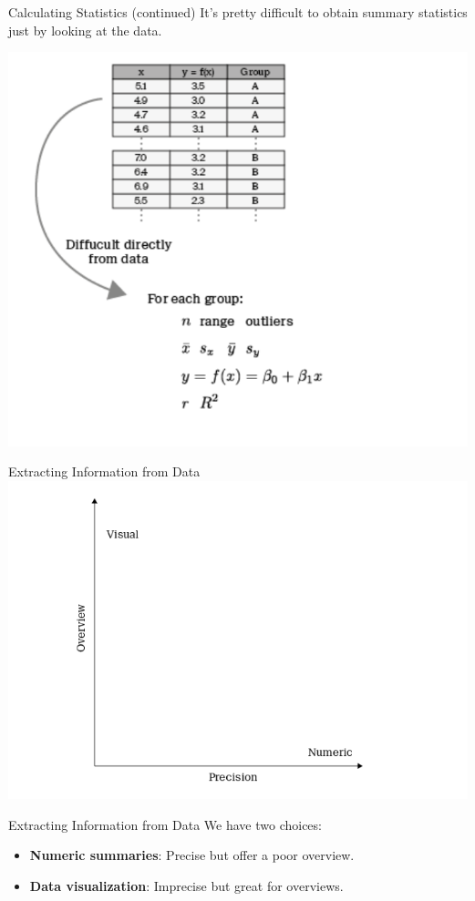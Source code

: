 \documentclass[
  ignorenonframetext,
]{beamer}
\providecommand{\tightlist}{%
  \setlength{\itemsep}{0pt}\setlength{\parskip}{0pt}}
\begin{document}
\begin{frame}{Calculating Statistics (continued)}
\label{calculating-statistics-continued}
It's pretty difficult to obtain summary statistics just by looking at
the data.

\includegraphics{../images/im169.png}
\end{frame}

\begin{frame}{Extracting Information from Data}
\label{extracting-information-from-data}
\includegraphics{../images/im170.png}
\end{frame}

\begin{frame}{Extracting Information from Data}
\label{extracting-information-from-data-1}
We have two choices:

\begin{itemize}
\tightlist
\item
  \textbf{Numeric summaries}: Precise but offer a poor overview.
\item
  \textbf{Data visualization}: Imprecise but great for overviews.
\end{itemize}
\end{frame}
\end{document}
